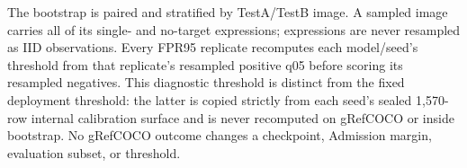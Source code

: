 The bootstrap is paired and stratified by TestA/TestB image.  A sampled image
carries all of its single- and no-target expressions; expressions are never
resampled as IID observations.  Every FPR95 replicate recomputes each
model/seed's threshold from that replicate's resampled positive q05 before
scoring its resampled negatives.  This diagnostic threshold is distinct from
the fixed deployment threshold: the latter is copied strictly from each
seed's sealed 1,570-row internal calibration surface and is never recomputed
on gRefCOCO or inside bootstrap.  No gRefCOCO outcome changes a checkpoint,
Admission margin, evaluation subset, or threshold.
